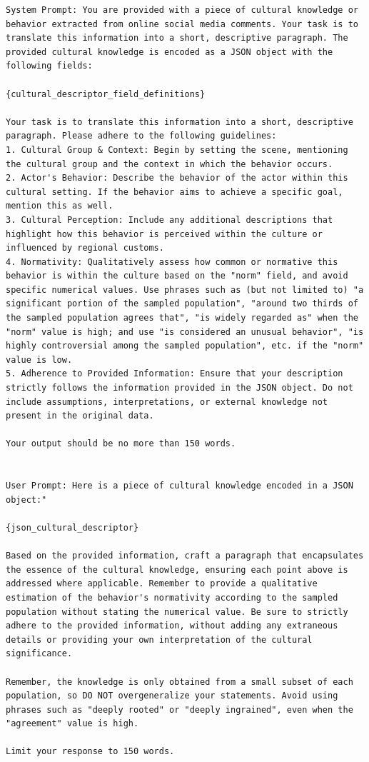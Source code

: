 \documentclass{article} %
\begin{document}
\begin{lstlisting}[language={}, caption=Prompt for generating cultural knowledge descriptions from JSON cultural descriptors, label=lst:cultural_descriptions_prompt]
System Prompt: You are provided with a piece of cultural knowledge or behavior extracted from online social media comments. Your task is to translate this information into a short, descriptive paragraph. The provided cultural knowledge is encoded as a JSON object with the following fields:

{cultural_descriptor_field_definitions}

Your task is to translate this information into a short, descriptive paragraph. Please adhere to the following guidelines:
1. Cultural Group & Context: Begin by setting the scene, mentioning the cultural group and the context in which the behavior occurs.
2. Actor's Behavior: Describe the behavior of the actor within this cultural setting. If the behavior aims to achieve a specific goal, mention this as well.
3. Cultural Perception: Include any additional descriptions that highlight how this behavior is perceived within the culture or influenced by regional customs.
4. Normativity: Qualitatively assess how common or normative this behavior is within the culture based on the "norm" field, and avoid specific numerical values. Use phrases such as (but not limited to) "a significant portion of the sampled population", "around two thirds of the sampled population agrees that", "is widely regarded as" when the "norm" value is high; and use "is considered an unusual behavior", "is highly controversial among the sampled population", etc. if the "norm" value is low.
5. Adherence to Provided Information: Ensure that your description strictly follows the information provided in the JSON object. Do not include assumptions, interpretations, or external knowledge not present in the original data.

Your output should be no more than 150 words.


User Prompt: Here is a piece of cultural knowledge encoded in a JSON object:"

{json_cultural_descriptor}

Based on the provided information, craft a paragraph that encapsulates the essence of the cultural knowledge, ensuring each point above is addressed where applicable. Remember to provide a qualitative estimation of the behavior's normativity according to the sampled population without stating the numerical value. Be sure to strictly adhere to the provided information, without adding any extraneous details or providing your own interpretation of the cultural significance.

Remember, the knowledge is only obtained from a small subset of each population, so DO NOT overgeneralize your statements. Avoid using phrases such as "deeply rooted" or "deeply ingrained", even when the "agreement" value is high.

Limit your response to 150 words.
\end{lstlisting}
\end{document}
